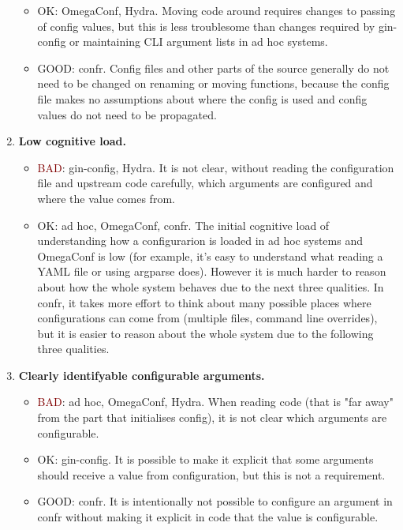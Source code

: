 \documentclass{itatnew}
\begin{document}
\begin{enumerate}
\begin{itemize}
            \item \textcolor{YellowOrange}{OK}: OmegaConf, Hydra. Moving code around requires changes to passing of config values, but this is less troublesome than changes required by gin-config or maintaining CLI argument lists in ad hoc systems.
            \item \textcolor{OliveGreen}{GOOD}: confr. Config files and other parts of the source generally do not need to be changed on renaming or moving functions, because the config file makes no assumptions about where the config is used and config values do not need to be propagated.
        \end{itemize}
    \item \textbf{Low cognitive load.}
        \begin{itemize}
            \item \textcolor{Maroon}{BAD}: gin-config, Hydra. It is not clear, without reading the configuration file and upstream code carefully, which arguments are configured and where the value comes from.
            \item \textcolor{YellowOrange}{OK}: ad hoc, OmegaConf, confr.
            The initial cognitive load of understanding how a configurarion is loaded in ad hoc systems and OmegaConf is low (for example, it's easy to understand what reading a YAML file or using argparse does). However it is much harder to reason about how the whole system behaves due to the next three qualities.
            In confr, it takes more effort to think about many possible places where configurations can come from (multiple files, command line overrides), but it is easier to reason about the whole system due to the following three qualities.
        \end{itemize}
    \item \textbf{Clearly identifyable configurable arguments.}
        \begin{itemize}
            \item \textcolor{Maroon}{BAD}: ad hoc, OmegaConf, Hydra. When reading code (that is "far away" from the part that initialises config), it is not clear which arguments are configurable.
            \item \textcolor{YellowOrange}{OK}: gin-config. It is possible to make it explicit that some arguments should receive a value from configuration, but this is not a requirement.
            \item \textcolor{OliveGreen}{GOOD}: confr. It is intentionally not possible to configure an argument in confr without making it explicit in code that the value is configurable.

\end{itemize}
\end{enumerate}
\end{document}
